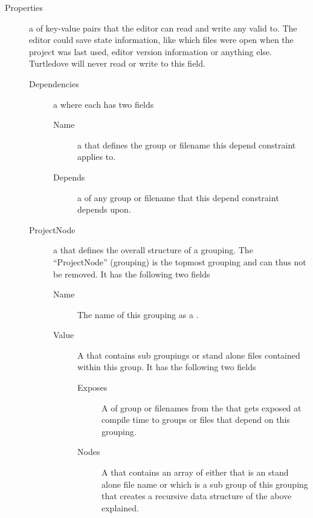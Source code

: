 \begin{description}
\item[Properties] a  of key-value pairs that the editor can
  read and write any valid  to. The editor could save state
  information, like which files were open when the project was last used,
  editor version information or anything else. Turtledove will never read or
  write to this field.
  
  \begin{description}
  \item[Dependencies] a  where each 
    has two fields
    
    \begin{description}
    \item[Name] a  that defines the group or filename this
      depend constraint applies to.
      
    \item[Depends] a  of any group or filename that this
      depend constraint depends upon.
    \end{description}
    
    
  \item[ProjectNode] a  that defines the overall
    structure of a grouping. The ``ProjectNode'' (grouping) is the topmost
    grouping and can thus not be removed. It has the following two fields
    
    \begin{description}
    \item[Name] The name of this grouping as a .
      
    \item[Value] A  that contains sub groupings or stand
      alone files contained within this group. It has the following two fields
      
      \begin{description}
      \item[Exposes] A  of group or filenames from the
         that gets exposed at compile time to groups or files
        that depend on this grouping.
        
      \item[Nodes] A  that contains an array of either
         that is an stand alone file name or
         which is a sub group of this grouping that
        creates a recursive data structure of the above explained.
      \end{description}
    \end{description}      
  \end{description}
\end{description}


